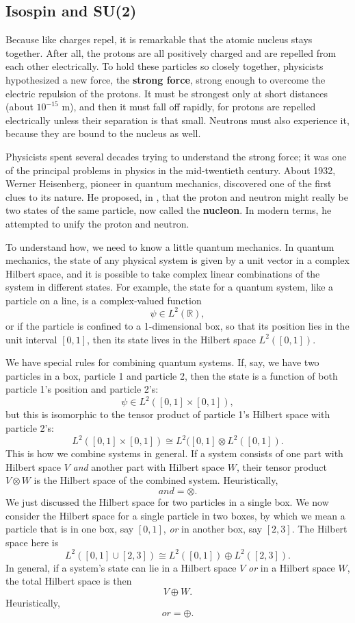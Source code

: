 \documentclass[12pt]{article}
\newcommand{\R}{{\mathbb R}}  %
\newcommand{\iso}{\cong} %
\begin{document}
\subsection{Isospin and {\rm{SU(2)}}} \label{sec:isospin}

Because like charges repel, it is remarkable that the atomic nucleus
stays together. After all, the protons are all positively charged and
are repelled from each other electrically.  To hold these particles so
closely together, physicists hypothesized a new force, the
\textbf{strong force}, strong enough to overcome the electric
repulsion of the protons.  It must be strongest only at short
distances (about $10^{-15}$ m), and then it must fall off rapidly, for
protons are repelled electrically unless their separation is that
small.  Neutrons must also experience it, because they are bound to
the nucleus as well.

Physicists spent several decades trying to understand the strong force; it was
one of the principal problems in physics in the mid-twentieth century. About
1932, Werner Heisenberg, pioneer in quantum mechanics, discovered one of the
first clues to its nature. He proposed, in \cite{heisenberg:77}, that the
proton and neutron might really be two states of the same particle, now
called the \textbf{nucleon}.  In modern terms, he attempted to unify the 
proton and neutron. 

To understand how, we need to know a little quantum mechanics.
In quantum mechanics, the state of any physical system is given by a 
unit vector in a complex Hilbert space, and it is possible to take 
complex linear combinations of the system in different states.  For 
example, the state for a quantum system, like a particle on a line, 
is a complex-valued function 
\[	\psi \in L^2(\R) , 	\]
or if the particle is confined to a 1-dimensional box, so that its
position lies in the unit interval $[0,1]$, then its state lives 
in the Hilbert space $L^2([0,1])$.

We have special rules for combining quantum systems. If, say, we have two
particles in a box, particle 1 and particle 2, then the state is a
function of both particle 1's position and particle 2's:
\[	\psi \in L^2([0,1] \times [0,1]),	\]
but this is isomorphic to the tensor product of particle 1's Hilbert space with
particle 2's:
\[	L^2( [0,1] \times [0,1] ) \iso L^2([0,1] \otimes L^2([0,1]).	\]
This is how we combine systems in general. If a system consists of one part
with Hilbert space $V$ \emph{and} another part with Hilbert space $W$, 
their tensor product $V \otimes W$ is the Hilbert space of the combined system.
Heuristically, 
\[	\textit{and} = \otimes.	\]
We just discussed the Hilbert space for two particles in a single box. We now
consider the Hilbert space for a single particle in two boxes, by which we mean
a particle that is in one box, say $[0,1]$, \emph{or} in another box, say 
$[2,3]$.  The Hilbert space here is
\[	L^2( [0,1] \cup [2,3]) \iso L^2([0,1]) \oplus L^2([2,3]).	\]
In general, if a system's state can lie in a Hilbert space $V$ \emph{or} in a 
Hilbert space $W$, the total Hilbert space is then
\[	V \oplus W.	\]
Heuristically,
\[	\textit{or} = \oplus.	\]
\end{document}
